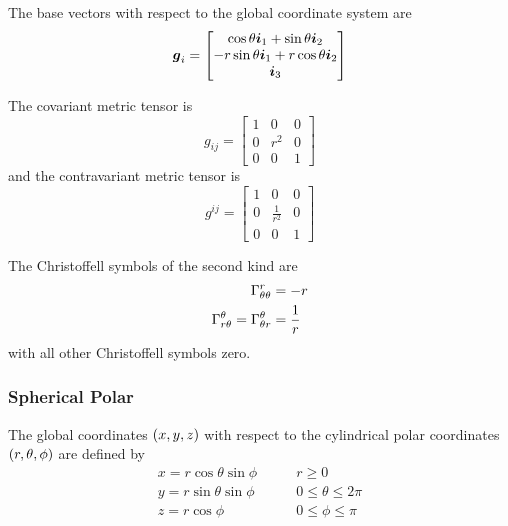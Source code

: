 The base vectors with respect to the global coordinate system are
\begin{equation}
  \vect{g}_{i}=\begin{bmatrix} 
    \cos\theta\vect{i}_{1} + \sin\theta\vect{i}_{2} \\ 
    -r\sin\theta\vect{i}_{1}+ r\cos\theta\vect{i}_{2} \\
    \vect{i}_{3} 
  \end{bmatrix}
\end{equation}

The covariant metric tensor is
\begin{equation}
  g_{ij}=\begin{bmatrix}
    1 & 0 & 0 \\
    0 & r^{2} & 0 \\
    0 & 0 & 1
  \end{bmatrix}
\end{equation}
and the contravariant metric tensor is
\begin{equation}
  g^{ij}=\begin{bmatrix}
    1 & 0 & 0 \\
    0 & \frac{1}{r^{2}} & 0 \\
    0 & 0 & 1
  \end{bmatrix}
\end{equation}

The Christoffell symbols of the second kind are
\begin{align}
   \Gamma^{r}_{\theta\theta} &=-r \\
   \Gamma^{\theta}_{r\theta} = \Gamma^{\theta}_{\theta r} &=\frac{1}{r}
\end{align}
with all other Christoffell symbols zero.

\subsubsection{Spherical Polar}

The global coordinates $\left( x,y,z \right)$ with respect to the cylindrical polar
coordinates $\left( r,\theta,\phi \right)$ are defined by
\begin{equation}
  \begin{aligned}
    x = r\cos\theta\sin\phi & \qquad r \ge 0 \\
    y = r\sin\theta\sin\phi & \qquad 0 \le \theta \le 2\pi \\
    z = r\cos\phi & \qquad 0 \le \phi \le \pi
  \end{aligned}
\end{equation}

